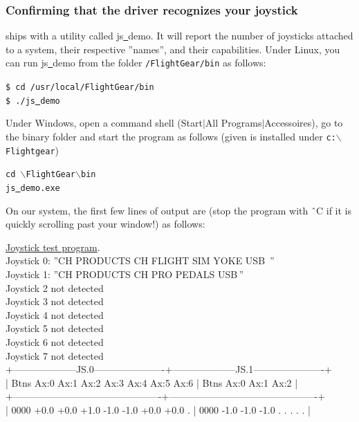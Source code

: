 \subsubsection{Confirming that the driver recognizes your joystick\label{confirming}}
\FlightGear{} ships with a utility called js\underline{~}demo. It will report the number of joysticks attached to a system, their respective ''names'', and their capabilities. Under Linux, you can run js\underline{~}demo from the folder \texttt{/FlightGear/bin} as follows:
\medskip

\noindent
	\texttt{\$ cd /usr/local/FlightGear/bin}\\	
	\texttt{\$ ./js\underline{~}demo}
\medskip

\noindent
Under Windows, open a command shell (Start$\left|\right.$All Programs$\left|\right.$Accessoires), go to the \FlightGear{} binary folder and start the program as follows (given \FlightGear{} is installed under \texttt{c:$\backslash$Flightgear})
\medskip

\noindent
	\texttt{cd {$\backslash$}FlightGear{$\backslash$}bin}\\	
	\texttt{js\underline{~}demo.exe}
\medskip

On our system, the first few lines of output are (stop the program with \^{~}C if it is quickly scrolling  past your window!) as follows:
\medskip

\begin{ttfamily}
\tiny
\noindent
\underline{Joystick test program}.\\
Joystick 0: ''CH PRODUCTS CH FLIGHT SIM YOKE USB\, ''\\
Joystick 1: ''CH PRODUCTS CH PRO PEDALS USB\,''\\
Joystick 2 not detected\\
Joystick 3 not detected\\
Joystick 4 not detected\\
Joystick 5 not detected\\
Joystick 6 not detected\\
Joystick 7 not detected\\
+--------------------JS.0----------------------+--------------------JS.1----------------------+\\
| Btns Ax:0 Ax:1 Ax:2 Ax:3 Ax:4 Ax:5 Ax:6      | Btns Ax:0 Ax:1 Ax:2                          |\\
+----------------------------------------------+----------------------------------------------+\\
| 0000 +0.0 +0.0 +1.0 -1.0 -1.0 +0.0 +0.0   .  | 0000 -1.0 -1.0 -1.0   .    .    .    .    .  |\\
\end{ttfamily}

